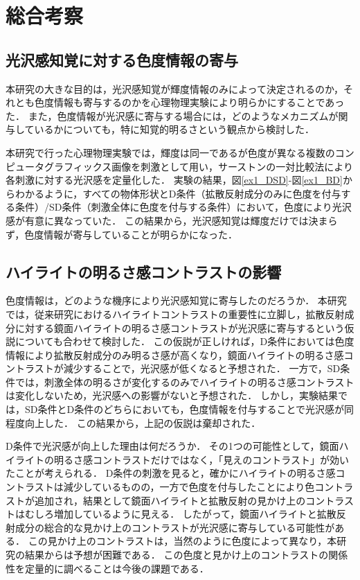 \chapter{総合考察}
    \section{光沢感知覚に対する色度情報の寄与}
        本研究の大きな目的は，光沢感知覚が輝度情報のみによって決定されるのか，それとも色度情報も寄与するのかを心理物理実験により明らかにすることであった．
        また，色度情報が光沢感に寄与する場合には，どのようなメカニズムが関与しているかについても，特に知覚的明るさという観点から検討した．
        
        本研究で行った心理物理実験では，輝度は同一であるが色度が異なる複数のコンピュータグラフィックス画像を刺激として用い，サーストンの一対比較法により各刺激に対する光沢感を定量化した．
        実験の結果，図\ref{ex1_DSD}-図\ref{ex1_BD}からわかるように，すべての物体形状とD条件（拡散反射成分のみに色度を付与する条件）/SD条件（刺激全体に色度を付与する条件）において，色度により光沢感が有意に異なっていた．
        この結果から，光沢感知覚は輝度だけでは決まらず，色度情報が寄与していることが明らかになった．

    \section{ハイライトの明るさ感コントラストの影響}
        色度情報は，どのような機序により光沢感知覚に寄与したのだろうか．
        本研究では，従来研究におけるハイライトコントラストの重要性に立脚し，拡散反射成分に対する鏡面ハイライトの明るさ感コントラストが光沢感に寄与するという仮説についても合わせて検討した．
        この仮説が正しければ，D条件においては色度情報により拡散反射成分のみ明るさ感が高くなり，鏡面ハイライトの明るさ感コントラストが減少することで，光沢感が低くなると予想された．
        一方で，SD条件では，刺激全体の明るさが変化するのみでハイライトの明るさ感コントラストは変化しないため，光沢感への影響がないと予想された．
        しかし，実験結果では，SD条件とD条件のどちらにおいても，色度情報を付与することで光沢感が同程度向上した．
        この結果から，上記の仮説は棄却された．

        D条件で光沢感が向上した理由は何だろうか．
        その1つの可能性として，鏡面ハイライトの明るさ感コントラストだけではなく，「見えのコントラスト」が効いたことが考えられる．
        D条件の刺激を見ると，確かにハイライトの明るさ感コントラストは減少しているものの，一方で色度を付与したことにより色コントラストが追加され，結果として鏡面ハイライトと拡散反射の見かけ上のコントラストはむしろ増加しているように見える．
        したがって，鏡面ハイライトと拡散反射成分の総合的な見かけ上のコントラストが光沢感に寄与している可能性がある．
        この見かけ上のコントラストは，当然のように色度によって異なり，本研究の結果からは予想が困難である．
        この色度と見かけ上のコントラストの関係性を定量的に調べることは今後の課題である．

